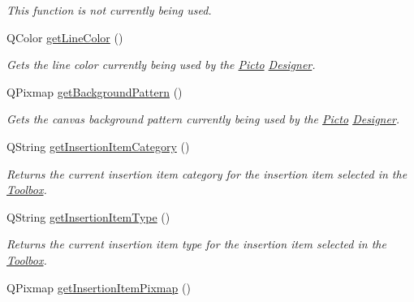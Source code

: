 \begin{DoxyCompactItemize}
\begin{DoxyCompactList}\small\item\em This function is not currently being used. \end{DoxyCompactList}\item 
Q\-Color \hyperlink{class_editor_state_a952a655485c8f041c07cdb2057de7a6a}{get\-Line\-Color} ()
\begin{DoxyCompactList}\small\item\em Gets the line color currently being used by the \hyperlink{namespace_picto}{Picto} \hyperlink{class_designer}{Designer}. \end{DoxyCompactList}\item 
Q\-Pixmap \hyperlink{class_editor_state_a05c8e0b1e9f22aab5ae167a06f04f7b5}{get\-Background\-Pattern} ()
\begin{DoxyCompactList}\small\item\em Gets the canvas background pattern currently being used by the \hyperlink{namespace_picto}{Picto} \hyperlink{class_designer}{Designer}. \end{DoxyCompactList}\item 
\hypertarget{class_editor_state_a6a4490d34f24efa4c03136e4e006ecf4}{Q\-String \hyperlink{class_editor_state_a6a4490d34f24efa4c03136e4e006ecf4}{get\-Insertion\-Item\-Category} ()}\label{class_editor_state_a6a4490d34f24efa4c03136e4e006ecf4}

\begin{DoxyCompactList}\small\item\em Returns the current insertion item category for the insertion item selected in the \hyperlink{class_toolbox}{Toolbox}. \end{DoxyCompactList}\item 
\hypertarget{class_editor_state_ac4302956d19a3aeb7db98ea811a95b6f}{Q\-String \hyperlink{class_editor_state_ac4302956d19a3aeb7db98ea811a95b6f}{get\-Insertion\-Item\-Type} ()}\label{class_editor_state_ac4302956d19a3aeb7db98ea811a95b6f}

\begin{DoxyCompactList}\small\item\em Returns the current insertion item type for the insertion item selected in the \hyperlink{class_toolbox}{Toolbox}. \end{DoxyCompactList}\item 
\hypertarget{class_editor_state_a054a40b7782f1810c8f0dd349a536efc}{Q\-Pixmap \hyperlink{class_editor_state_a054a40b7782f1810c8f0dd349a536efc}{get\-Insertion\-Item\-Pixmap} ()}\label{class_editor_state_a054a40b7782f1810c8f0dd349a536efc}


\end{DoxyCompactItemize}
